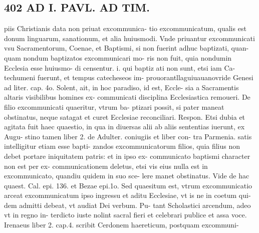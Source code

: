 \documentclass{article}
\begin{document}
\begin{pages}
\section*{402 AD I. PAVL. AD TIM. }\pstart piis Christianis data non priuat excommunica- tio excommunicatum, qualis est donum linguarum, sanationum, et alia huiusmodi. Vnde priuantur excommunicati vsu Sacramentorum, Coenae, et Baptismi, si non fuerint adhuc baptizati, quan- quam nondum baptizatos excommunicari mo- ris non fuit, quia nondumin Ecclesia esse huiusmo- di censentur. i. qui baptiz ati non sunt, etsi iam Ca- techumeni fuerunt, et tempus catecheseos im- prouorantllaguiuauanovride Genesi ad liter. cap. 4o. Solent, ait, in hoc paradiso, id est, Eccle- sia a Sacramentis altaris visibilibus homines ex- communicati disciplina Ecclesiastica remoueri.  \pend\pstart De filio excommunicati quaeritur, vtrum ba- ptizari possit, si pater maneat obstinatus, neque satagat et curet Ecclesiae reconciliari. Respon. Etsi dubia et agitata fuit haec quaestio, in qua in diuersas alii ab aliis sententias iuerunt, ex Augu- stino tamen liber 2. de Adulter. coniugiis et liber con- tra Parmenia. satis intelligitur etiam esse bapti- zandos excommunicatorum filios, quia filius non debet portare iniquitatem patris: et in ipso ex- communicato baptismi character non est per ex- communicationem deletus, etsi vis eius nulla est in excommunicato, quandiu quidem in suo sce- lere manet obstinatus. Vide de hac quaest. Cal. epi. 136. et Bezae epi.1o. Sed quaesitum est, vtrum excommunicatio arceat excommunicatum ipso ingressu et aditu Ecclesiae, vt is ne in coetum qui- dem admitti debeat, vt audiat Dei verbum. Pu- tant Scholastici arcendum, adeo vt in regno in- terdicto iuste nolint sacral fieri et celebrari publice et assa voce. Irenaeus liber 2. cap.4. scribit Cerdonem haereticum, postquam excommuni-  \pend

\end{pages}
\end{document}
